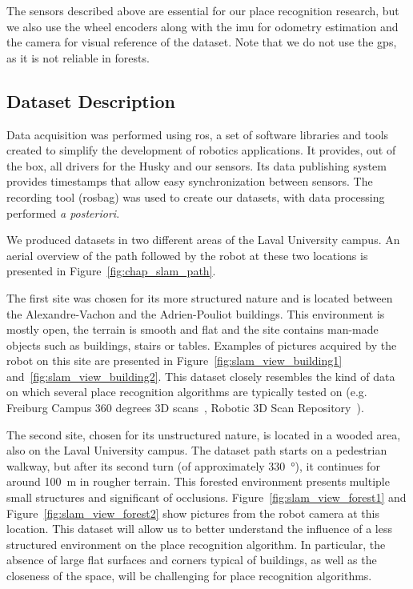 The sensors described above are essential for our place recognition research, but we also use the wheel encoders along with the \gls*{imu} for odometry estimation and the camera for visual reference of the dataset. Note that we do not use the \gls*{gps}, as it is not reliable in forests. 


\subsection{Dataset Description}
\label{ssec:chap_slam_platform}

Data acquisition was performed using \gls*{ros}, a set of software libraries and tools created to simplify the development of robotics applications. It provides, out of the box, all drivers for the Husky and our sensors. Its data publishing system provides timestamps that allow easy synchronization between sensors. The recording tool (rosbag) was used to create our datasets, with data processing performed \textit{a posteriori}.

We produced datasets in two different areas of the Laval University campus. An aerial overview of the path followed by the robot at these two locations is presented in Figure~\ref{fig:chap_slam_path}.

The first site was chosen for its more structured nature and is located between the Alexandre-Vachon and the Adrien-Pouliot buildings. This environment is mostly open, the terrain is smooth and flat and the site contains man-made objects such as buildings, stairs or tables. Examples of pictures acquired by the robot on this site are presented in Figure~\ref{fig:slam_view_building1} and~\ref{fig:slam_view_building2}. This dataset closely resembles the kind of data on which several place recognition algorithms are typically tested on (e.g. Freiburg Campus 360 degrees 3D scans~\citep{FreiburgDataset}, Robotic 3D Scan Repository~\citep{Datasets}).

The second site, chosen for its unstructured nature, is located in a wooded area, also on the Laval University campus. The dataset path starts on a pedestrian walkway, but after its second turn (of approximately \SI{330}{\degree}), it continues for around \SI{100}{\meter} in rougher terrain. This forested environment presents multiple small structures and significant of occlusions. Figure~\ref{fig:slam_view_forest1} and Figure~\ref{fig:slam_view_forest2} show pictures from the robot camera at this location. This dataset will allow us to better understand the influence of a less structured environment on the place recognition algorithm. In particular, the absence of large flat surfaces and corners typical of buildings, as well as the closeness of the space, will be challenging for place recognition algorithms.

